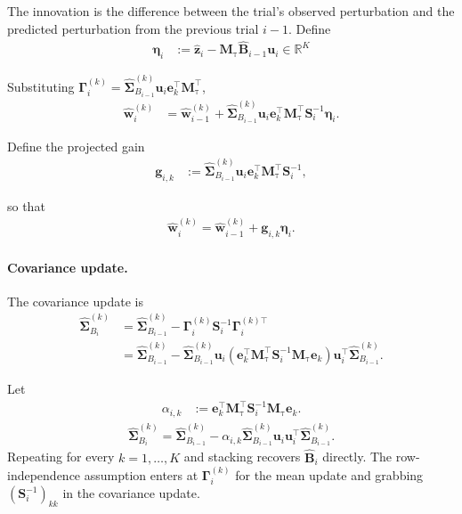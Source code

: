 \documentclass[11pt,letterpaper]{article} %
\begin{document}
The innovation is the difference between the trial's observed perturbation and the predicted perturbation from the previous trial $i-1$. Define
\begin{align*}
    \boldsymbol{\eta}_i
    &:=
    \hat{\bm{z}}_i
    -
    \bm{M}_{\mathrm{\tau}}
    \hat{\bm{B}}_{i-1}
    \bm{u}_i
    \in\mathbb{R}^K
\end{align*}

Substituting
$\bm{\Gamma}_i^{(k)}
=
\hat{\bm{\Sigma}}_{B_{i-1}}^{(k)}
\bm{u}_i
\bm{e}_k^\top
\bm{M}_{\mathrm{\tau}}^\top$,
\begin{align*}
    \hat{\bm{w}}_i^{(k)}
    &=
    \hat{\bm{w}}_{i-1}^{(k)}
    +
    \hat{\bm{\Sigma}}_{B_{i-1}}^{(k)}
    \bm{u}_i
    \bm{e}_k^\top
    \bm{M}_{\mathrm{\tau}}^\top
    \bm{S}_i^{-1}
    \boldsymbol{\eta}_i.
\end{align*}

Define the projected gain
\begin{align*}
    \bm{g}_{i,k}
    &:=
    \hat{\bm{\Sigma}}_{B_{i-1}}^{(k)}
    \bm{u}_i
    \bm{e}_k^\top
    \bm{M}_{\mathrm{\tau}}^\top
    \bm{S}_i^{-1},
\end{align*}

so that
\begin{align*}
    \boxed{
    \hat{\bm{w}}_i^{(k)}
    =
    \hat{\bm{w}}_{i-1}^{(k)}
    +
    \bm{g}_{i,k}\boldsymbol{\eta}_i
    }.
\end{align*}

\paragraph{Covariance update.}
The covariance update is
\begin{align*}
    \hat{\bm{\Sigma}}_{B_i}^{(k)}
    &=
    \hat{\bm{\Sigma}}_{B_{i-1}}^{(k)}
    -
    \bm{\Gamma}_i^{(k)}
    \bm{S}_i^{-1}
    \bm{\Gamma}_i^{(k)\top}
    \\
    &=
    \hat{\bm{\Sigma}}_{B_{i-1}}^{(k)}
    -
    \hat{\bm{\Sigma}}_{B_{i-1}}^{(k)}
    \bm{u}_i
    \left(
        \bm{e}_k^\top
        \bm{M}_{\mathrm{\tau}}^\top
        \bm{S}_i^{-1}
        \bm{M}_{\mathrm{\tau}}
        \bm{e}_k
    \right)
    \bm{u}_i^\top
    \hat{\bm{\Sigma}}_{B_{i-1}}^{(k)}.
\end{align*}

Let
\begin{align*}
    \alpha_{i,k}
    &:=
    \bm{e}_k^\top
    \bm{M}_{\mathrm{\tau}}^\top
    \bm{S}_i^{-1}
    \bm{M}_{\mathrm{\tau}}
    \bm{e}_k.
\end{align*}
\begin{align*}
    \boxed{
    \hat{\bm{\Sigma}}_{B_i}^{(k)}
    =
    \hat{\bm{\Sigma}}_{B_{i-1}}^{(k)}
    -
    \alpha_{i,k}
    \hat{\bm{\Sigma}}_{B_{i-1}}^{(k)}
    \bm{u}_i\bm{u}_i^\top
    \hat{\bm{\Sigma}}_{B_{i-1}}^{(k)}
    }.
\end{align*}
Repeating for every $k=1,\dots,K$ and stacking recovers $\hat{\bm{B}}_i$ directly. The row-independence assumption enters at $\bm{\Gamma}_i^{(k)}$ for the mean update and grabbing $(\bm{S}_i^{-1})_{kk}$ in the covariance update.
\end{document}
